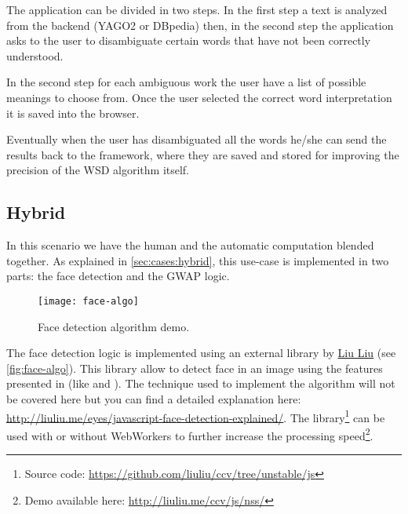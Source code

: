 The application can be divided in two steps. In the first step a text is
analyzed from the backend (YAGO2 or DBpedia) then, in the second step the
application asks to the user to disambiguate certain words that have not been
correctly understood.

In the second step for each ambiguous work the user have a list of possible
meanings to choose from. Once the user selected the correct word interpretation
it is saved into the browser.

Eventually when the user has disambiguated all the words he/she can send the
results back to the framework, where they are saved and stored for improving the
precision of the \ac{WSD} algorithm itself.





















\subsection{Hybrid}
In this scenario we have the human and the automatic computation blended together.
As explained in \ref{sec:cases:hybrid}, this use-case is implemented in two
parts: the face detection and the \ac{GWAP} logic.\\

\begin{figure}[htb]
    \centering
    \texttt{[image: face-algo]}
    \caption{Face detection algorithm demo.}
    \label{fig:face-algo}
\end{figure}

The face detection logic is implemented using an external library  by
\href{http://liuliu.me/}{Liu Liu} (see \autoref{fig:face-algo}). This library allow to detect face in an image
using the \js{} features presented in (like  and ).
The technique used to implement the algorithm will not be covered here but you
can find a detailed explanation here:
\url{http://liuliu.me/eyes/javascript-face-detection-explained/}.
The library\footnote{Source code: \url{https://github.com/liuliu/ccv/tree/unstable/js}}
can be used with or without WebWorkers to further increase the processing
speed\footnote{Demo available here: \url{http://liuliu.me/ccv/js/nss/}}.\\


